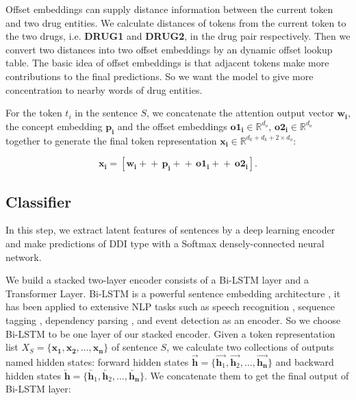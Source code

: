 \documentclass[conference]{IEEEtran}
\begin{document}
Offset embeddings can supply distance information between the current token and two drug 
entities.
We calculate distances of tokens from the current token to the two drugs, i.e. \textbf{DRUG1} and \textbf{DRUG2}, in the drug pair respectively.
Then we convert two distances into two offset embeddings by an dynamic offset lookup table.
The basic idea of offset embeddings is that adjacent tokens make more contributions to the final predictions.
So we want the model to give more concentration to nearby words of drug entities.

For the token $t_i$ in the sentence $S$, we concatenate the attention output vector $\bm{w_i}$,
the concept embedding $\bm{p_i}$ and the offset embeddings $\bm{o1_i} \in \mathbb{R}^{d_o}$,
$\bm{o2_i} \in \mathbb{R}^{d_o}$ together to generate the final token representation $\bm{x_i} \in \mathbb{R}^{d_k + d_k + 2 \times d_o}$:

\begin{equation}
	\bm{x_i} = \left [ \bm{w_i} +\!\!\!\!+\, \bm{p_i} +\!\!\!\!+\, \bm{o1_i} +\!\!\!\!+\, \bm{o2_i} \right ].
\end{equation}

\subsection{Classifier}
In this step, we extract latent features of sentences by a deep learning encoder and make predictions of DDI type with a Softmax densely-connected neural network.

We build a stacked two-layer encoder consists of a Bi-LSTM layer and a Transformer Layer.
Bi-LSTM \cite{hochreiter_long_1997, schuster_bidirectional_1997} is a powerful sentence embedding architecture \cite{lin_structured_2017}, it has been applied to extensive NLP tasks such as
speech recognition \cite{sak_long_2014}, sequence tagging \cite{huang_bidirectional_2015}, dependency parsing \cite{kiperwasser_simple_2016}, and event detection \cite{feng_language-independent_2018}
as an encoder.
So we choose Bi-LSTM to be one layer of our stacked encoder.
Given a token representation list $X_S = \{ \bm{x_1}, \bm{x_2}, \dots, \bm{x_n} \}$  of sentence $S$, we calculate two collections
of outputs named hidden states:
forward hidden states $\overrightarrow{\bm{h}} = \{\overrightarrow{\bm{h}_1}, \overrightarrow{\bm{h}_2}, \dots, \overrightarrow{\bm{h_n}}\}$
and backward hidden states $\overleftarrow{\bm{h}} = \{\overleftarrow{\bm{h}_1}, \overleftarrow{\bm{h}_2}, \dots, \overleftarrow{\bm{h_n}}\}$.
We concatenate them to get the final output of Bi-LSTM layer:
\end{document}
